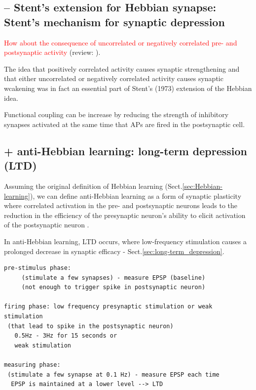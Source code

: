 \subsection{ -- Stent's extension for Hebbian synapse: Stent's mechanism for
synaptic depression}

\textcolor{red}{How about the consequence of uncorrelated or negatively
correlated pre- and postsynaptic activity} (review: \citep{brown1990}).

The idea that positively correlated activity causes synaptic strengthening and
that either uncorrelated or negatively correlated activity causes synaptic
wcakening was in fact an essential part of Stent's (1973) extension of the
Hebbian idea.

Functional coupling can be increase by reducing the strength of inhibitory
synapses activated at the same time  that APs are fired in the postsynaptic
cell. 



\subsection{+ anti-Hebbian learning: long-term depression (LTD)}
\label{sec:anti-Hebbian-learning}

Assuming the original definition of Hebbian learning
(Sect.\ref{sec:Hebbian-learning}), we can define anti-Hebbian learning as a form
of synaptic plasticity where correlated activation in the pre- and postsynaptic
neurons leads to the reduction in the efficiency of the presynaptic neuron's
ability to elicit activation of the postsynaptic neuron \citep{choe2014}.

In anti-Hebbian learning, LTD occurs, where low-frequency stimulation
causes a prolonged decrease in synaptic efficacy -
Sect.\ref{sec:long-term_depression}.

\begin{verbatim}
pre-stimulus phase:
     (stimulate a few synapses) - measure EPSP (baseline)
	 (not enough to trigger spike in postsynaptic neuron)

firing phase: low frequency presynaptic stimulation or weak stimulation
 (that lead to spike in the postsynaptic neuron)
   0.5Hz - 3Hz for 15 seconds or
   weak stimulation

measuring phase:   
 (stimulate a few synapse at 0.1 Hz) - measure EPSP each time
  EPSP is maintained at a lower level --> LTD
\end{verbatim}

